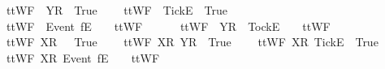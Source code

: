 \ \ {\isachardoublequoteopen}ttWF{}\ {\isacharbrackleft}{\isacharbrackright}\ {\isacharbrackleft}{\isacharbrackleft}Y{\isacharbrackright}\isactrlsub R{\isacharbrackright}\ {\isacharequal}\ True{\isachardoublequoteclose}\ {\isacharbar}\ \isanewline
\ \ {\isachardoublequoteopen}ttWF{}\ {\isacharbrackleft}{\isacharbrackright}\ {\isacharbrackleft}{\isacharbrackleft}Tick{\isacharbrackright}\isactrlsub E{\isacharbrackright}\ {\isacharequal}\ True{\isachardoublequoteclose}\ {\isacharbar}\ \isanewline
\ \ {\isachardoublequoteopen}ttWF{}\ {\isacharbrackleft}{\isacharbrackright}\ {\isacharparenleft}{\isacharbrackleft}Event\ f{\isacharbrackright}\isactrlsub E\ {\isacharhash}\ {\isasymsigma}{\isacharparenright}\ {\isacharequal}\ ttWF{}\ {\isacharbrackleft}{\isacharbrackright}\ {\isasymsigma}{\isachardoublequoteclose}\ {\isacharbar}\ \isanewline
\ \ {\isachardoublequoteopen}ttWF{}\ {\isacharbrackleft}{\isacharbrackright}\ {\isacharparenleft}{\isacharbrackleft}Y{\isacharbrackright}\isactrlsub R\ {\isacharhash}\ {\isacharbrackleft}Tock{\isacharbrackright}\isactrlsub E\ {\isacharhash}\ {\isasymsigma}{\isacharparenright}\ {\isacharequal}\ ttWF{}\ {\isacharbrackleft}{\isacharbrackright}\ {\isasymsigma}{\isachardoublequoteclose}\ {\isacharbar}\ \isanewline
\ \ {\isachardoublequoteopen}ttWF{}\ {\isacharbrackleft}{\isacharbrackleft}X{\isacharbrackright}\isactrlsub R{\isacharbrackright}\ {\isacharbrackleft}{\isacharbrackright}\ {\isacharequal}\ True{\isachardoublequoteclose}\ {\isacharbar}\ \isanewline
\ \ {\isachardoublequoteopen}ttWF{}\ {\isacharbrackleft}{\isacharbrackleft}X{\isacharbrackright}\isactrlsub R{\isacharbrackright}\ {\isacharbrackleft}{\isacharbrackleft}Y{\isacharbrackright}\isactrlsub R{\isacharbrackright}\ {\isacharequal}\ True{\isachardoublequoteclose}\ {\isacharbar}\ \isanewline
\ \ {\isachardoublequoteopen}ttWF{}\ {\isacharbrackleft}{\isacharbrackleft}X{\isacharbrackright}\isactrlsub R{\isacharbrackright}\ {\isacharbrackleft}{\isacharbrackleft}Tick{\isacharbrackright}\isactrlsub E{\isacharbrackright}\ {\isacharequal}\ True{\isachardoublequoteclose}\ {\isacharbar}\ \isanewline
\ \ {\isachardoublequoteopen}ttWF{}\ {\isacharbrackleft}{\isacharbrackleft}X{\isacharbrackright}\isactrlsub R{\isacharbrackright}\ {\isacharparenleft}{\isacharbrackleft}Event\ f{\isacharbrackright}\isactrlsub E\ {\isacharhash}\ {\isasymsigma}{\isacharparenright}\ {\isacharequal}\ ttWF{}\ {\isacharbrackleft}{\isacharbrackright}\ {\isasymsigma}{\isachardoublequoteclose}\ {\isacharbar}\ \isanewline
